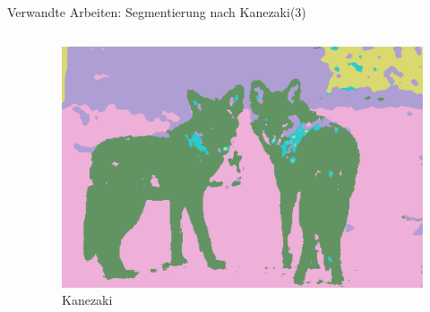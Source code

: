 \documentclass[9pt]{beamer}
\begin{document}
\begin{frame}{Verwandte Arbeiten: Segmentierung nach Kanezaki\footnotemark[1] (3)}
\begin{columns}
\begin{column}{.33\textwidth}
	\end{column}
	\begin{column}{.33\textwidth}
		\begin{figure}
			\includegraphics[width=\textwidth,keepaspectratio]{kanezaki_out.png}
			\caption{Kanezaki}
		\end{figure}
	\end{column}
\end{columns}

\end{frame}
\end{document}
